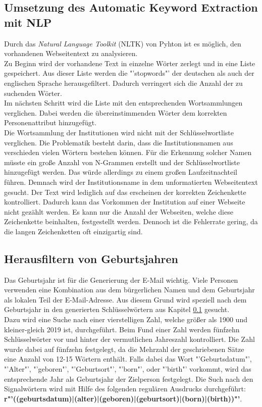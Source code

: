 	\subsection{Umsetzung des Automatic Keyword Extraction mit NLP}
		\label{subsec:AutomaticKeywordExtractionNLP}
		Durch das \textit{Natural Language Toolkit} (NLTK) von Pyhton ist es möglich, den vorhandenen Webseitentext zu analysieren.\\
		Zu Beginn wird der vorhandene Text in einzelne Wörter zerlegt und in eine Liste gespeichert. Aus dieser Liste werden die "'stopwords"' der deutschen als auch der englischen Sprache herausgefiltert. Dadurch verringert sich die Anzahl der zu suchenden Wörter. \\ %
		Im nächsten Schritt wird die Liste mit den entsprechenden Wortsammlungen verglichen. Dabei werden die übereinstimmenden Wörter dem korrekten Personenattribut hinzugefügt.\\
		Die Wortsammlung der Institutionen wird nicht mit der Schlüsselwortliste verglichen. Die Problematik besteht darin, dass die Institutionsnamen aus verschieden vielen Wörtern bestehen können. Für die Erkennung solcher Namen müsste ein große Anzahl von N-Grammen erstellt und der Schlüsselwortliste hinzugefügt werden. Das würde allerdings zu einem großen Laufzeitnachteil führen. Demnach wird der Institutionsname in dem unformatierten Webseitentext gesucht. Der Text wird lediglich auf das erscheinen der korrekten Zeichenkette kontrolliert. Dadurch kann das Vorkommen der Institution auf einer Webseite nicht gezählt werden. Es kann nur die Anzahl der Webseiten, welche diese Zeichenkette beinhalten, festgestellt werden. Dennoch ist die Fehlerrate gering, da die langen Zeichenketten oft einzigartig sind.
		

	\subsection{Herausfiltern von Geburtsjahren}
		Das Geburtsjahr ist für die Generierung der E-Mail wichtig. Viele Personen verwenden eine Kombination aus dem bürgerlichen Namen und dem Geburtsjahr als lokalen Teil der E-Mail-Adresse. Aus diesem Grund wird speziell nach dem Geburtsjahr in den generierten Schlüsselwörtern aus Kapitel \ref{subsec:AutomaticKeywordExtractionNLP} gesucht.\\
		Dazu wird eine Suche nach einer vierstelligen Zahl, welche größer als 1900 und kleiner-gleich 2019 ist, durchgeführt. Beim Fund einer Zahl werden  fünfzehn Schlüsselwörter vor und hinter der vermutlichen Jahreszahl kontrolliert. Die Zahl wurde dabei auf fünfzehn festgelegt, da die Mehrzahl der geschriebenen Sätze eine Anzahl von 12-15 Wörtern enthält. \cite{seibicke1969schreibt} Falls dabei das Wort "'Geburtsdatum"', "'Alter"', "'geboren"', "'Geburtsort"', "'born"', oder "'birth"' vorkommt, wird das entsprechende Jahr als Geburtsjahr der Zielperson festgelegt. Die Such nach den Signalwörtern wird mit Hilfe des folgenden regulären Ausdrucks durchgeführt:
		\textbf{r"'((geburtsdatum)|(alter)|(geboren)|(geburtsort)|(born)|(birth))"'}.
		
